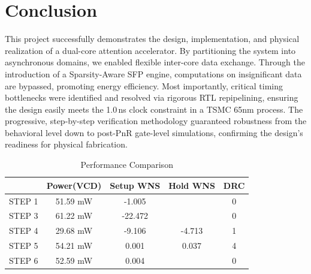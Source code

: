 \documentclass[journal]{IEEEtran}
\begin{document}
\section{Conclusion}
This project successfully demonstrates the design, implementation, and physical realization of a dual-core attention accelerator. By partitioning the system into asynchronous domains, we enabled flexible inter-core data exchange. Through the introduction of a Sparsity-Aware SFP engine, computations on insignificant data are bypassed, promoting energy efficiency. Most importantly, critical timing bottlenecks were identified and resolved via rigorous RTL repipelining, ensuring the design easily meets the 1.0\,ns clock constraint in a TSMC 65nm process. The progressive, step-by-step verification methodology guaranteed robustness from the behavioral level down to post-PnR gate-level simulations, confirming the design's readiness for physical fabrication.

 \begin{table}[htbp]
    \caption{Performance Comparison\label{tab:s1}}
    \begin{center}
        \begin{tabular}{|c|c|c|c|c|}
            \hline
            \textbf{} & \textbf{Power(VCD)} & \textbf{Setup WNS} & \textbf{Hold WNS} & \textbf{DRC} \\
            \hline
            STEP 1 &  51.59 mW & -1.005  & & 0  \\
            STEP 3 &  61.22 mW & -22.472 & & 0  \\
            STEP 4 &  29.68 mW & -9.106 & -4.713 & 1 \\
            STEP 5 &  54.21 mW &  0.001 & 0.037 & 4 \\
            STEP 6 &  52.59 mW &  0.004 & & 0 \\
            \hline
        \end{tabular}
    \end{center}
\end{table}
\end{document}
